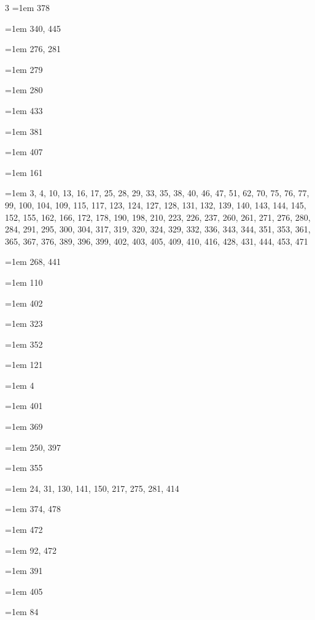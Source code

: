 \begin{multicols}{3}
\hangindent=1em  378\par
\hangindent=1em  340, 445\par
\hangindent=1em  276, 281\par
\hangindent=1em  279\par
\hangindent=1em  280\par
\hangindent=1em  433\par
\hangindent=1em  381\par
\hangindent=1em  407\par
\hangindent=1em  161\par
\hangindent=1em  3, 4, 10, 13, 16, 17, 25, 28, 29, 33, 35, 38, 40, 46, 47, 51, 62, 70, 75, 76, 77, 99, 100, 104, 109, 115, 117, 123, 124, 127, 128, 131, 132, 139, 140, 143, 144, 145, 152, 155, 162, 166, 172, 178, 190, 198, 210, 223, 226, 237, 260, 261, 271, 276, 280, 284, 291, 295, 300, 304, 317, 319, 320, 324, 329, 332, 336, 343, 344, 351, 353, 361, 365, 367, 376, 389, 396, 399, 402, 403, 405, 409, 410, 416, 428, 431, 444, 453, 471\par
\hangindent=1em  268, 441\par
\hangindent=1em  110\par
\hangindent=1em  402\par
\hangindent=1em  323\par
\hangindent=1em  352\par
\hangindent=1em  121\par
\hangindent=1em  4\par
\hangindent=1em  401\par
\hangindent=1em  369\par
\hangindent=1em  250, 397\par
\hangindent=1em  355\par
\hangindent=1em  24, 31, 130, 141, 150, 217, 275, 281, 414\par
\hangindent=1em  374, 478\par
\hangindent=1em  472\par
\hangindent=1em  92, 472\par
\hangindent=1em  391\par
\hangindent=1em  405\par
\hangindent=1em  84\par

\end{multicols}
